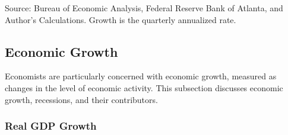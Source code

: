 \documentclass{report}
\newcommand{\tbllink}[1]{\href{https://raw.githubusercontent.com/bdecon/US-chartbook/master/chartbook/data/#1}{\faTable}}
\begin{document}
\begin{minipage}{0.68\textwidth}		
\footnotesize{Source: Bureau of Economic Analysis, Federal Reserve Bank of Atlanta, and Author's Calculations. Growth is the quarterly annualized rate.}\end{minipage} \hspace{1mm} \begin{minipage}{0.07\textwidth}\hfill \tbllink{gdpjobslvl.csv} \vspace{4mm} \end{minipage}
\newpage
\hypertarget{oegr}{\label{oegr}} \hypertarget{gdpgr}{}
\vspace*{-11mm}

\begin{minipage}{1.0\textwidth} 
\subsection*{Economic Growth}
\small Economists are particularly concerned with economic growth, measured as changes in the level of economic activity. This subsection discusses economic growth, recessions, and their contributors.

\subsubsection*{Real GDP Growth} 
\vspace{-1mm}

\small  
\end{minipage}
\end{document}

